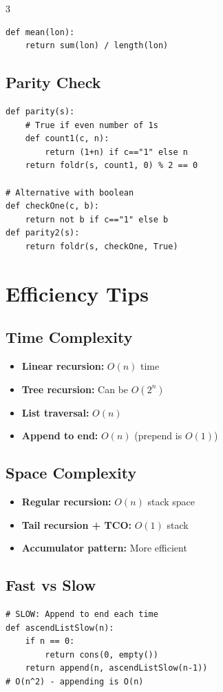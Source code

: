 \documentclass[8pt,landscape,a4paper]{article}
\begin{document}
\begin{multicols}{3}
\begin{lstlisting}
def mean(lon):
    return sum(lon) / length(lon)
\end{lstlisting}

\subsection*{Parity Check}
\begin{lstlisting}
def parity(s):
    # True if even number of 1s
    def count1(c, n):
        return (1+n) if c=="1" else n
    return foldr(s, count1, 0) % 2 == 0

# Alternative with boolean
def checkOne(c, b):
    return not b if c=="1" else b
def parity2(s):
    return foldr(s, checkOne, True)
\end{lstlisting}

\section*{Efficiency Tips}

\subsection*{Time Complexity}
\begin{itemize}[itemsep=0pt]
    \item \textbf{Linear recursion:} $O(n)$ time
    \item \textbf{Tree recursion:} Can be $O(2^n)$ 
    \item \textbf{List traversal:} $O(n)$
    \item \textbf{Append to end:} $O(n)$ (prepend is $O(1)$)
\end{itemize}

\subsection*{Space Complexity}
\begin{itemize}[itemsep=0pt]
    \item \textbf{Regular recursion:} $O(n)$ stack space
    \item \textbf{Tail recursion + TCO:} $O(1)$ stack
    \item \textbf{Accumulator pattern:} More efficient
\end{itemize}

\subsection*{Fast vs Slow}
\begin{lstlisting}
# SLOW: Append to end each time
def ascendListSlow(n):
    if n == 0:
        return cons(0, empty())
    return append(n, ascendListSlow(n-1))
# O(n^2) - appending is O(n)


\end{lstlisting}
\end{multicols}
\end{document}
